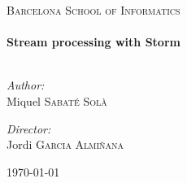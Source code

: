 

\begin{titlepage}
\begin{center}

\textsc{\Large Barcelona School of Informatics}\\[0.5cm]

{ \small \HRule \\[0.4cm] }
{ \huge \bf Stream processing with Storm \\[0.4cm] }
{ \small \HRule \\[0.4cm] }

\begin{minipage}{0.4\textwidth}
\begin{flushleft} \large
\emph{Author:}\\
Miquel \textsc{Sabaté Solà}
\end{flushleft}
\end{minipage}
\begin{minipage}{0.4\textwidth}
\begin{flushright} \large
\emph{Director:} \\
Jordi \textsc{Garcia Almiñana}
\end{flushright}
\end{minipage}

\vfill

{\large \today}

\end{center}
\end{titlepage}
